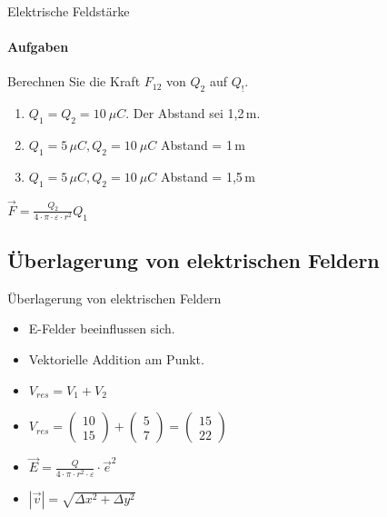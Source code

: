 \begin{frame}{Elektrische Feldstärke}
  \framesubtitle{Aufgaben}
  Berechnen Sie die Kraft $F_{12}$ von $Q_2$ auf $Q_!$.

  \begin{enumerate}
   \item $Q_1 = Q_2 = 10\ \mu C$. Der Abstand sei 1,2\,m.
   \item $Q_1 = 5\, \mu C, Q_2 = 10\ \mu C$ Abstand = 1\,m
   \item $Q_1 = 5\, \mu C, Q_2 = 10\ \mu C$ Abstand = 1,5\,m
  \end{enumerate}

  $\vec{F} = \frac{Q_2}{4 \cdot \pi \cdot \varepsilon \cdot r^2} Q_1 $
\end{frame}

\subsection[Überlagerung E]{Überlagerung von elektrischen Feldern}
%

\begin{frame}{Überlagerung von elektrischen Feldern}
  \begin{itemize}
   \item E-Felder beeinflussen sich.
   \item Vektorielle Addition am Punkt.
   \item $V_{res} = V_1 + V_2$
   \item $V_{res} = \left(\begin{array}{c} 10 \\ 15 \end{array}\right) + \left(\begin{array}{c} 5 \\ 7 \end{array}\right) = \left(\begin{array}{c} 15 \\ 22 \end{array}\right)$
   \item $\vec{E} = \frac{Q}{4 \cdot \pi \cdot r^2 \cdot \varepsilon}\cdot \vec{e}^2$
   \item $|\vec{v}| = \sqrt{\Delta x^2 + \Delta y^2}$\\
  \end{itemize}
\end{frame}



